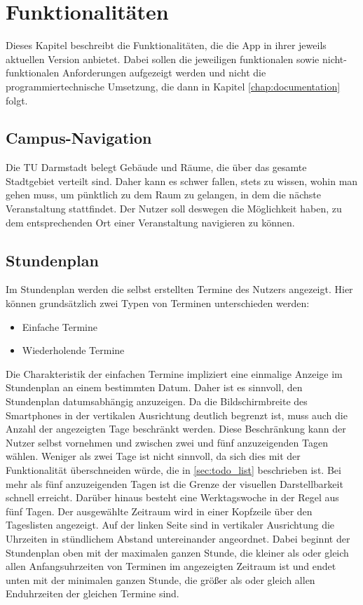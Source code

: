\documentclass[noindent]{tudreport}
\begin{document}
	\chapter{Funktionalitäten}\label{chap:functionalities}
		Dieses Kapitel beschreibt die Funktionalitäten, die die App in ihrer jeweils aktuellen Version anbietet. Dabei sollen die jeweiligen funktionalen sowie nicht-funktionalen Anforderungen aufgezeigt werden und nicht die programmiertechnische Umsetzung, die dann in Kapitel \ref{chap:documentation} folgt.
		
		\section{Campus-Navigation}\label{sec:campus_navigation}
			Die TU Darmstadt belegt Gebäude und Räume, die über das gesamte Stadtgebiet verteilt sind. Daher kann es schwer fallen, stets zu wissen, wohin man gehen muss, um pünktlich zu dem Raum zu gelangen, in dem die nächste Veranstaltung stattfindet. Der Nutzer soll deswegen die Möglichkeit haben, zu dem entsprechenden Ort einer Veranstaltung navigieren zu können.
		
		\section{Stundenplan}\label{sec:timetable}
			Im Stundenplan werden die selbst erstellten Termine des Nutzers angezeigt. Hier können grundsätzlich zwei Typen von Terminen unterschieden werden:
			\begin{itemize}
				\item Einfache Termine
				
				\item Wiederholende Termine
			\end{itemize}
			Die Charakteristik der einfachen Termine impliziert eine einmalige Anzeige im Stundenplan an einem bestimmten Datum. Daher ist es sinnvoll, den Stundenplan datumsabhängig anzuzeigen. Da die Bildschirmbreite des Smartphones in der vertikalen Ausrichtung deutlich begrenzt ist, muss auch die Anzahl der angezeigten Tage beschränkt werden. Diese Beschränkung kann der Nutzer selbst vornehmen und zwischen zwei und fünf anzuzeigenden Tagen wählen. Weniger als zwei Tage ist nicht sinnvoll, da sich dies mit der Funktionalität überschneiden würde, die in \ref{sec:todo_list} beschrieben ist. Bei mehr als fünf anzuzeigenden Tagen ist die Grenze der visuellen Darstellbarkeit schnell erreicht. Darüber hinaus besteht eine Werktagswoche in der Regel aus fünf Tagen. Der ausgewählte Zeitraum wird in einer Kopfzeile über den Tageslisten angezeigt. Auf der linken Seite sind in vertikaler Ausrichtung die Uhrzeiten in stündlichem Abstand untereinander angeordnet. Dabei beginnt der Stundenplan oben mit der maximalen ganzen Stunde, die kleiner als oder gleich allen Anfangsuhrzeiten von Terminen im angezeigten Zeitraum ist und endet unten mit der minimalen ganzen Stunde, die größer als oder gleich allen Enduhrzeiten der gleichen Termine sind.
		
\end{document}
